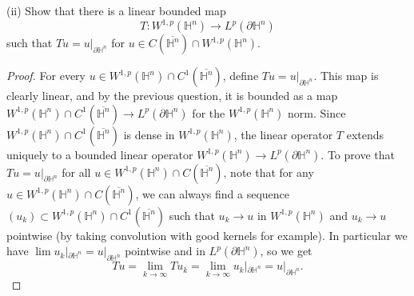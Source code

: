 \documentclass{article}
\begin{document}
(ii) Show that there is a linear bounded map
\[
T:W^{1,p}(\mathbb{H}^n)\to L^p(\partial\mathbb{H}^n)
\]
such that $Tu=u|_{\partial\mathbb{H}^n}$ for $u\in C(\overline{\mathbb{H}^n})\cap W^{1,p}(\mathbb{H}^n)$.
\begin{proof}
    For every $u\in W^{1,p}(\mathbb{H}^n)\cap C^1(\overline{\mathbb{H}^n})$, define $Tu=u|_{\partial\mathbb{H}^n}$. This map is clearly linear, and by the previous question, it is bounded as a map $W^{1,p}(\mathbb{H}^n)\cap C^1(\overline{\mathbb{H}^n})\to L^p(\partial\mathbb{H}^n)$ for the $W^{1,p}(\mathbb{H}^n)$ norm. Since $W^{1,p}(\mathbb{H}^n)\cap C^1(\overline{\mathbb{H}^n})$ is dense in $W^{1,p}(\mathbb{H}^n)$, the linear operator $T$ extends uniquely to a bounded linear operator $W^{1,p}(\mathbb{H}^n)\to L^p(\partial\mathbb{H}^n)$. To prove that $Tu=u|_{\partial\mathbb{H}^n}$ for all $u\in W^{1,p}(\mathbb{H}^n)\cap C(\overline{\mathbb{H}^n})$, note that for any $u\in W^{1,p}(\mathbb{H}^n)\cap C(\overline{
    \mathbb{H}^n})$, we can always find a sequence $(u_k)\subset W^{1,p}(\mathbb{H}^n)\cap C^1(\overline{\mathbb{H}^n})$ such that $u_k\to u$ in $W^{1,p}(\mathbb{H}^n)$ and $u_k\to u$ pointwise (by taking convolution with good kernels for example). In particular we have $\lim u_k|_{\partial\mathbb{H}^n}=u|_{\partial\mathbb{H}^n}$ pointwise and in $L^p(\partial\mathbb{H}^n)$, so we get
    \[
    Tu=\lim_{k\to\infty}Tu_k=\lim_{k\to\infty}u_k|_{\partial\mathbb{H}^n}=u|_{\partial\mathbb{H}^n}.
    \]
\end{proof}
\end{document}
